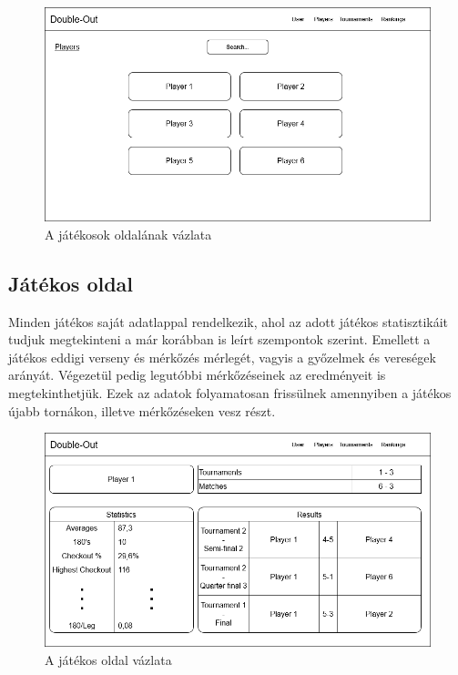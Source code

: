\begin{figure}[h]
\centering
\includegraphics[scale=0.3]{images/PlayersPage.drawio.png}
\caption{A játékosok oldalának vázlata}
\label{fig:cimer}
\end{figure}

\subsection{Játékos oldal}
Minden játékos saját adatlappal rendelkezik, ahol az adott játékos statisztikáit tudjuk megtekinteni a már korábban is leírt szempontok szerint. Emellett a játékos eddigi verseny és mérkőzés mérlegét, vagyis a győzelmek és vereségek arányát. Végezetül pedig legutóbbi mérkőzéseinek az eredményeit is megtekinthetjük. Ezek az adatok folyamatosan frissülnek amennyiben a játékos újabb tornákon, illetve mérkőzéseken vesz részt.

\begin{figure}[h]
\centering
\includegraphics[scale=0.3]{images/PlayerPage.drawio.png}
\caption{A játékos oldal vázlata}
\label{fig:cimer}
\end{figure}

